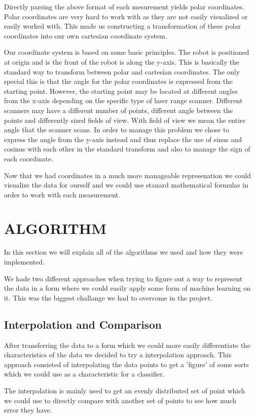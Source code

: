 \documentclass[a4paper, 10pt, conference]{ieeeconf}      %
\begin{document}
Directly parsing the above format of each mesurement yields polar coordinates. Polar coordinates are very hard to work with as they are not easily visualized or easily worked with. This made us constructing a transformation of these polar coordinates into our own cartesian coordinate system.

Our coordinate system is based on some basic principles. The robot is positioned at origin and is the front of the robot is along the y-axis. This is basically the standard way to transform between polar and cartesian coordinates. The only special this is that the angle for the polar coordinates is expressed from the starting point. However, the starting point may be located at different angles from the x-axis depending on the specific type of laser range scanner. Different scanners may have a different number of points, different angle between the points and differently sized fields of view. With field of view we mean the entire angle that the scanner scans. In order to manage this problem we chose to express the angle from the y-axis instead and thus replace the use of sinus and cosinus with each other in the standard transform and also to manage the sign of each coordinate.

Now that we had coordinates in a much more manageable represenation we could visualize the data for ourself and we could use stanard mathematical formulas in order to work with each measurement.

\section{ALGORITHM}
In this section we will explain all of the algorithms we used and how they were implemented. 

We hade two different approaches when trying to figure out a way to represent the data in a form where we could easily apply some form of machine learning on it. This was the biggest challange we had to overcome in the project. 
\subsection{Interpolation and Comparison}
After transferring the data to a form which we could more easily differentiate the characteristics of the data we decided to try a interpolation approach. This approach consisted of interpolating the data points to get a 'figure' of some sorts which we could use as a characteristic for a classifier.

The interpolation is mainly used to get an evenly distributed set of point which we could use to directly compare with another set of points to see how much error they have. 
\end{document}

